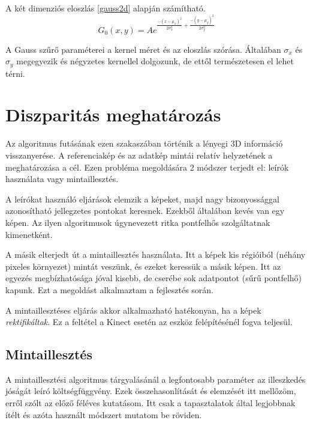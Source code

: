 A két dimenziós eloszlás \eqref{gauss2d} alapján számítható.
\begin{equation}
G_0(x,y) = A e^{\frac{-(x-\mu_x)^2}{2 \sigma_x^2}+\frac{-(y-\mu_y)^2}{2 \sigma_y^2}}
\label{eq:gauss2d}
\end{equation}

A Gauss szűrő paraméterei a kernel méret és az eloszlás szórása.
Általában $\sigma_x$ és $\sigma_y$ megegyezik és négyzetes kernellel dolgozunk, de ettől természetesen el lehet térni.

\section{Diszparitás meghatározás}\label{sect:Depthproc}

Az algoritmus futásának ezen szakaszában történik a lényegi 3D információ visszanyerése.
A referenciakép és az adatkép mintái relatív helyzetének a meghatározása a cél.
Ezen probléma megoldására 2 módszer terjedt el: leírók használata vagy mintaillesztés.

A leírókat használó eljárások elemzik a képeket, majd nagy bizonyossággal azonosítható jellegzetes pontokat keresnek.
Ezekből általában kevés van egy képen.
Az ilyen algoritmusok úgynevezett ritka pontfelhős szolgáltatnak kimenetként.

A másik elterjedt út a mintaillesztés használata.
Itt a képek kis régióiból (néhány pixeles környezet) mintát veszünk, és ezeket keressük a másik képen.
Itt az egyezés megbízhatósága jóval kisebb, de cserébe sok adatpontot (sűrű pontfelhő) kapunk.
Ezt a megoldást alkalmaztam a fejlesztés során.

A mintaillesztéses eljárás akkor alkalmazható hatékonyan, ha a képek \emph{rektifikáltak}.
Ez a feltétel a Kinect esetén az eszköz felépítésénél fogva teljesül.

\subsection{Mintaillesztés}\label{sect:templateMatch}

A mintaillesztési algoritmus tárgyalásánál a legfontosabb paraméter az illeszkedés jóságát leíró költségfüggvény.
Ezek összehasonlítását és elemzését itt mellőzöm, erről szólt az előző féléves kutatásom.
Itt csak a tapasztalatok által legjobbnak ítélt és azóta használt módszert mutatom be röviden.

